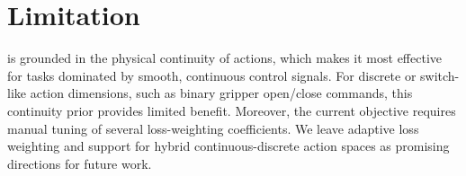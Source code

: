 \section{Limitation}
\m{} is grounded in the physical continuity of actions, which makes it most effective for tasks dominated by smooth, continuous control signals. For discrete or switch-like action dimensions, such as binary gripper open/close commands, this continuity prior provides limited benefit. Moreover, the current objective requires manual tuning of several loss-weighting coefficients. We leave adaptive loss weighting and support for hybrid continuous-discrete action spaces as promising directions for future work.